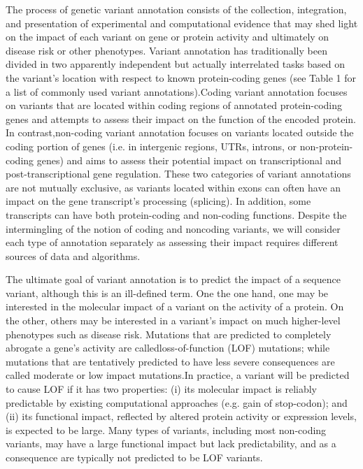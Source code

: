 The process of genetic variant annotation consists of the collection, integration, and presentation of experimental and computational evidence that may shed light on the impact of each variant on gene or protein activity and ultimately on disease risk or other phenotypes. Variant annotation has traditionally been divided in two apparently independent but actually interrelated tasks based on the variant’s location with respect to known protein-coding genes (see Table 1 for a list of commonly used variant annotations).Coding variant annotation focuses on variants that are located within coding regions of annotated protein-coding genes and attempts to assess their impact on the function of the encoded protein. In contrast,non-coding variant annotation focuses on variants located outside the coding portion of genes (i.e. in intergenic regions, UTRs, introns, or non-protein-coding genes) and aims to assess their potential impact on transcriptional and post-transcriptional gene regulation. These two categories of variant annotations are not mutually exclusive, as variants located within exons can often have an impact on the gene transcript’s processing (splicing). In addition, some transcripts can have both protein-coding and non-coding functions. Despite the intermingling of the notion of coding and noncoding variants, we will consider each type of annotation separately as assessing their impact requires different sources of data and algorithms.

The ultimate goal of variant annotation is to predict the impact of a sequence variant, although this is an ill-defined term. One the one hand, one may be interested in the molecular impact of a variant on the activity of a protein. On the other, others may be interested in a variant’s impact on much higher-level phenotypes such as disease risk. Mutations that are predicted to completely abrogate a gene’s activity are calledloss-of-function (LOF) mutations; while mutations that are tentatively predicted to have less severe consequences are called moderate or low impact mutations.In practice, a variant will be predicted to cause LOF if it has two properties: (i) its molecular impact is reliably predictable by existing computational approaches (e.g. gain of stop-codon); and (ii) its functional impact, reflected by altered protein activity or expression levels, is expected to be large. Many types of variants, including most non-coding variants, may have a large functional impact but lack predictability, and as a consequence are typically not predicted to be LOF variants.

